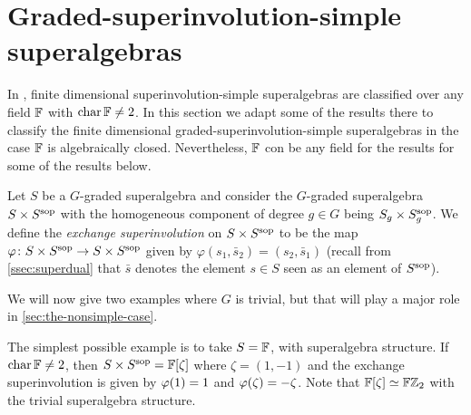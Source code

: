 \section{Graded-superinvolution-simple superalgebras}\label{grd-sinv-simple}

In \cite{racine}, finite dimensional superinvolution-simple superalgebras are classified over any field $\mathbb{F}$ with $\operatorname{char} \mathbb{F} \neq 2$. 
In this section we adapt some of the results there to classify the finite dimensional graded-superinvolution-simple superalgebras in the case $\mathbb{F}$ is algebraically closed. 
Nevertheless, $\mathbb{F}$ con be any field for the results for some of the results below. 


\begin{defi}\label{def:SxSsop}
	Let $S$ be a $G$-graded superalgebra and consider the $G$-graded superalgebra $S \times S^{\mathrm{sop}}$ with the homogeneous component of degree $g\in G$ being $S_g \times S^{\mathrm{sop}}_g$. 
	We define the \emph{exchange superinvolution} on $S \times S^{\mathrm{sop}}$ to be the map $\varphi\colon S \times S^{\mathrm{sop}} \to S \times S^{\mathrm{sop}}$ given by $\varphi (s_1, \bar s_2) = (s_2, \bar s_1)$ (recall from \cref{ssec:superdual} that $\bar s$ denotes the element $s \in S$ seen as an element of $S^{\mathrm{sop}}$). 
\end{defi}

We will now give two examples where $G$ is trivial, but that will play a major role in \cref{sec:the-nonsimple-case}.

\begin{ex}\label{ex:FxF-iso-FZ2}
	The simplest possible example is to take $S = \mathbb{F}$, with superalgebra structure. 
	If $\operatorname{char} \mathbb{F} \neq 2$, then $S\times S^{\mathrm{sop}} = \mathbb{F} [\zeta]$ where $\zeta = (1, -1)$ and the exchange superinvolution is given by $\varphi(1) = 1$ and $\varphi(\zeta) = -\zeta$.
	Note that $\mathbb{F} [\zeta] \simeq \mathbb{F}\mathbb{Z}_2$ with the trivial superalgebra structure. 
\end{ex}

